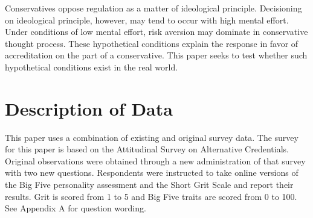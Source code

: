 \documentclass[review]{elsarticle}
\begin{document}
Conservatives oppose regulation as a matter of ideological principle\cite{teghtsoonian1993neo}.
Decisioning on ideological principle, however, may tend to occur with high mental effort.
Under conditions of low mental effort, risk aversion may dominate in conservative thought process.
These hypothetical conditions explain the response in favor of accreditation on the part of a conservative.
This paper seeks to test whether such hypothetical conditions exist in the real world.


\section{Description of Data}

This paper uses a combination of existing and original survey data.
The survey for this paper is based on the Attitudinal Survey on Alternative Credentials\cite{dataset_vandivier}.
Original observations were obtained through a new administration of that survey with two new questions.
Respondents were instructed to take online versions of the Big Five personality assessment and the Short Grit Scale and report their results.
Grit is scored from 1 to 5 and Big Five traits are scored from 0 to 100.
See Appendix A for question wording.
\end{document}
